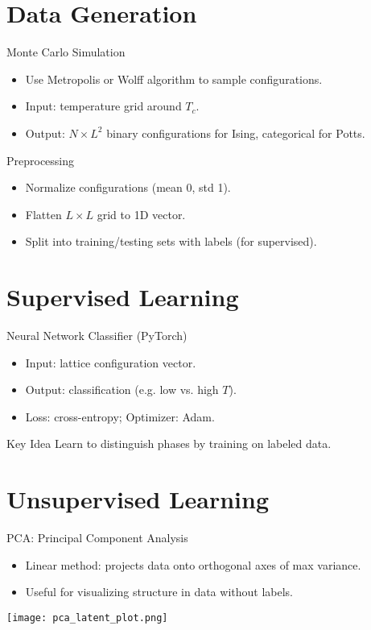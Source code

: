 \documentclass{beamer}
\begin{document}
\section{Data Generation}
\begin{frame}{Monte Carlo Simulation}
\begin{itemize}
    \item Use Metropolis or Wolff algorithm to sample configurations.
    \item Input: temperature grid around $T_c$.
    \item Output: $N \times L^2$ binary configurations for Ising, categorical for Potts.
\end{itemize}
\end{frame}

\begin{frame}{Preprocessing}
\begin{itemize}
    \item Normalize configurations (mean 0, std 1).
    \item Flatten $L \times L$ grid to 1D vector.
    \item Split into training/testing sets with labels (for supervised).
\end{itemize}
\end{frame}

\section{Supervised Learning}
\begin{frame}{Neural Network Classifier (PyTorch)}
\begin{itemize}
    \item Input: lattice configuration vector.
    \item Output: classification (e.g. low vs. high $T$).
    \item Loss: cross-entropy; Optimizer: Adam.
\end{itemize}
\begin{block}{Key Idea}
    Learn to distinguish phases by training on labeled data.
\end{block}
\end{frame}

\section{Unsupervised Learning}
\begin{frame}{PCA: Principal Component Analysis}
\begin{itemize}
    \item Linear method: projects data onto orthogonal axes of max variance.
    \item Useful for visualizing structure in data without labels.
\end{itemize}
\texttt{[image: pca\_latent\_plot.png]}
\end{frame}
\end{document}
